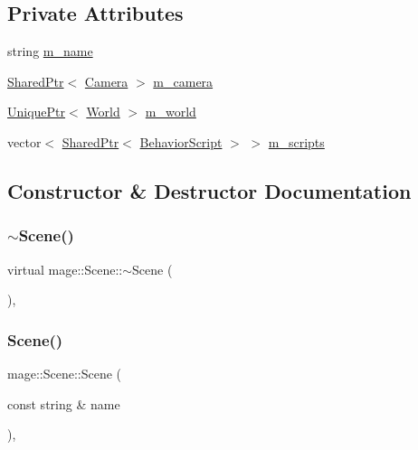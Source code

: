 \subsection*{Private Attributes}
\begin{DoxyCompactItemize}
\item 
string \hyperlink{classmage_1_1_scene_a6cc8cb08b1853c4e3063b33a94e8fb47}{m\+\_\+name}
\item 
\hyperlink{namespacemage_a1e01ae66713838a7a67d30e44c67703e}{Shared\+Ptr}$<$ \hyperlink{classmage_1_1_camera}{Camera} $>$ \hyperlink{classmage_1_1_scene_a961c280659f9934441d8e835508e933d}{m\+\_\+camera}
\item 
\hyperlink{namespacemage_a8c307fbcc33bce9b7f2aa4c26c3b95cf}{Unique\+Ptr}$<$ \hyperlink{classmage_1_1_world}{World} $>$ \hyperlink{classmage_1_1_scene_a0d06149d881166497bf75ae2288bf960}{m\+\_\+world}
\item 
vector$<$ \hyperlink{namespacemage_a1e01ae66713838a7a67d30e44c67703e}{Shared\+Ptr}$<$ \hyperlink{classmage_1_1_behavior_script}{Behavior\+Script} $>$ $>$ \hyperlink{classmage_1_1_scene_a84548bf6978f8955ce5892cb23536a4e}{m\+\_\+scripts}
\end{DoxyCompactItemize}


\subsection{Constructor \& Destructor Documentation}
\hypertarget{classmage_1_1_scene_a0db784091e75a472b20088ba7f1c2b26}{}\label{classmage_1_1_scene_a0db784091e75a472b20088ba7f1c2b26} 
\subsubsection{\texorpdfstring{$\sim$\+Scene()}{~Scene()}}
{\footnotesize\ttfamily virtual mage\+::\+Scene\+::$\sim$\+Scene (\begin{DoxyParamCaption}{ }\end{DoxyParamCaption})\hspace{0.3cm}{\ttfamily [virtual]}, {\ttfamily [default]}}

\hypertarget{classmage_1_1_scene_aab61b38547fc53aa9c5b3b559f4d2e26}{}\label{classmage_1_1_scene_aab61b38547fc53aa9c5b3b559f4d2e26} 
\subsubsection{\texorpdfstring{Scene()}{Scene()}\hspace{0.1cm}{\footnotesize\ttfamily [1/3]}}
{\footnotesize\ttfamily mage\+::\+Scene\+::\+Scene (\begin{DoxyParamCaption}\item[{const string \&}]{name }\end{DoxyParamCaption})\hspace{0.3cm}{\ttfamily [explicit]}, {\ttfamily [protected]}}

